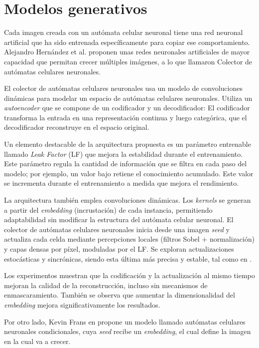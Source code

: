 \section{Modelos generativos}

Cada imagen creada con un autómata celular neuronal \cite{mordvintsevNCA} tiene una red neuronal artificial que ha sido entrenada específicamente para copiar ese comportamiento. Alejandro Hernández et al. \cite{NCAM} proponen unas redes neuronales artificiales de mayor capacidad que permitan crecer múltiples imágenes, a lo que llamaron Colector de autómatas celulares neuronales.

El colector de autómatas celulares neuronales usa un modelo de convoluciones dinámicas para modelar un espacio de autómatas celulares neuronales. Utiliza un \textit{autoencoder} que se compone de un codificador y un decodificador: El codificador transforma la entrada en una representación continua y luego categórica, que el decodificador reconstruye en el espacio original.

Un elemento destacable de la arquitectura propuesta es un parámetro entrenable llamado \textit{Leak Factor} (LF) que mejora la estabilidad durante el entrenamiento. Este parámetro regula la cantidad de información que se filtra en cada paso del modelo; por ejemplo, un valor bajo retiene el conocimiento acumulado. Este valor se incrementa durante el entrenamiento a medida que mejora el rendimiento.

La arquitectura también emplea convoluciones dinámicas. Los \textit{kernels} se generan a partir del \textit{embedding} (incrustación) de cada instancia, permitiendo adaptabilidad sin modificar la estructura del autómata celular neuronal. El colector de autómatas celulares neuronales inicia desde una imagen \textit{seed} y actualiza cada celda mediante percepciones locales (filtros Sobel $+$ normalización) y capas densas por píxel, moduladas por el LF. Se exploran actualizaciones estocásticas y sincrónicas, siendo esta última más precisa y estable, tal como en \cite{NiklassonNCA}.

Los experimentos muestran que la codificación y la actualización al mismo tiempo mejoran la calidad de la reconstrucción, incluso sin mecanismos de enmascaramiento. También se observa que aumentar la dimensionalidad del \textit{embedding} mejora significativamente los resultados.

Por otro lado, Kevin Frans en \cite{StampCA} propone un modelo llamado autómatas celulares neuronales condicionales, cuya \textit{seed} recibe un \textit{embedding}, el cual define la imagen en la cual va a crecer. 

